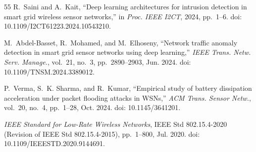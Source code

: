 \documentclass[conference]{IEEEtran}
\begin{document}
\begin{thebibliography}{55}
R.~Saini and A.~Kait, ``Deep learning architectures for intrusion detection in smart grid wireless sensor networks,'' in \textit{Proc. IEEE I2CT}, 2024, pp.~1--6. doi: 10.1109/I2CT61223.2024.10543210.

M.~Abdel-Basset, R.~Mohamed, and M.~Elhoseny, ``Network traffic anomaly detection in smart grid sensor networks using deep learning,'' \textit{IEEE Trans. Netw. Serv. Manage.}, vol.~21, no.~3, pp.~2890--2903, Jun. 2024. doi: 10.1109/TNSM.2024.3389012.

P.~Verma, S.~K. Sharma, and R.~Kumar, ``Empirical study of battery dissipation acceleration under packet flooding attacks in WSNs,'' \textit{ACM Trans. Sensor Netw.}, vol.~20, no.~4, pp.~1--28, Oct. 2024. doi: 10.1145/3641201.

\textit{IEEE Standard for Low-Rate Wireless Networks}, IEEE Std 802.15.4-2020 (Revision of IEEE Std 802.15.4-2015), pp.~1--800, Jul. 2020. doi: 10.1109/IEEESTD.2020.9144691.

\end{thebibliography}
\end{document}
